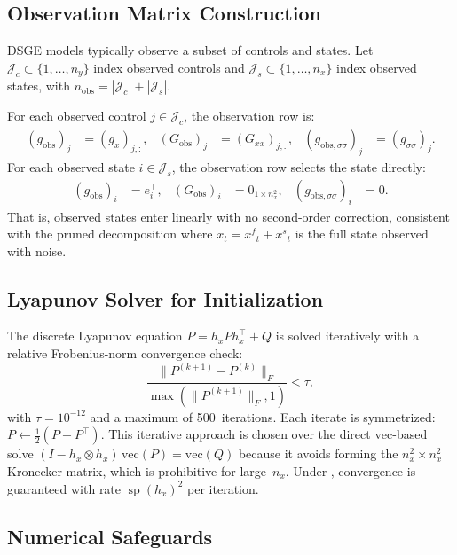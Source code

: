 \documentclass[12pt,a4paper]{article}
\newcommand{\vect}{\mathrm{vec}}
\newcommand{\kron}{\otimes}
\newcommand{\xf}{{x^{f}}}
\newcommand{\xs}{{x^{s}}}
\newcommand{\gx}{g_x}
\newcommand{\hx}{h_x}
\newcommand{\Gxx}{G_{xx}}
\newcommand{\gss}{{g_{\sigma\sigma}}}
\DeclareMathOperator{\specrad}{sp}
\begin{document}
\subsection{Observation Matrix Construction}\label{sec:obs-matrices}

DSGE models typically observe a subset of controls and states. Let
$\mathcal{J}_c \subset \{1, \ldots, n_y\}$ index observed controls
and $\mathcal{J}_s \subset \{1, \ldots, n_x\}$ index observed states,
with $n_{\mathrm{obs}} = |\mathcal{J}_c| + |\mathcal{J}_s|$.

For each observed control $j \in \mathcal{J}_c$, the observation
row is:
\begin{align}
(g_{\mathrm{obs}})_j &= (\gx)_{j,:}, &
(G_{\mathrm{obs}})_j &= (\Gxx)_{j,:}, &
(g_{\mathrm{obs},\sigma\sigma})_j &= (\gss)_j.
\end{align}
For each observed state $i \in \mathcal{J}_s$, the observation row
selects the state directly:
\begin{align}
(g_{\mathrm{obs}})_i &= e_i^\top, &
(G_{\mathrm{obs}})_i &= 0_{1 \times n_x^2}, &
(g_{\mathrm{obs},\sigma\sigma})_i &= 0.
\end{align}
That is, observed states enter linearly with no second-order
correction, consistent with the pruned decomposition where
$x_t = \xf_t + \xs_t$ is the full state observed with noise.

\subsection{Lyapunov Solver for Initialization}

The discrete Lyapunov equation $P = \hx P \hx^\top + Q$ is solved
iteratively with a relative Frobenius-norm convergence check:
\begin{equation}
\frac{\|P^{(k+1)} - P^{(k)}\|_F}
     {\max(\|P^{(k+1)}\|_F, 1)} < \tau,
\end{equation}
with $\tau = 10^{-12}$ and a maximum of 500~iterations. Each iterate
is symmetrized: $P \leftarrow \tfrac{1}{2}(P + P^\top)$. This
iterative approach is chosen over the direct $\mathrm{vec}$-based
solve $(I - \hx \kron \hx)\,\vect(P) = \vect(Q)$ because it avoids
forming the $n_x^2 \times n_x^2$ Kronecker matrix, which is
prohibitive for large~$n_x$. Under , convergence
is guaranteed with rate $\specrad(\hx)^2$ per iteration.

\subsection{Numerical Safeguards}
\end{document}
